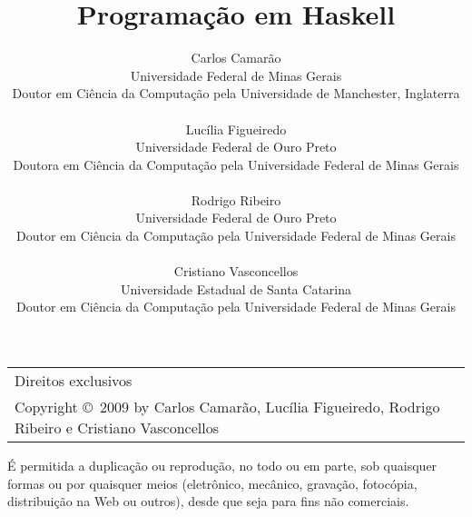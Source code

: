 \documentclass[a4paper,10pt]{book}
\title{Programa\c{c}\~ao em Haskell}
\author{Carlos Camarão\\
{\small Universidade Federal de Minas Gerais}\\
{\small Doutor em Ci\^encia da Computa\c{c}\~ao pela Universidade de Manchester, Inglaterra}\\ \\
Lucília Figueiredo\\
{\small Universidade Federal de Ouro Preto}\\
{\small Doutora em Ci\^encia da Computa\c{c}\~ao pela Universidade Federal de Minas Gerais}\\ \\
Rodrigo Ribeiro\\
{\small Universidade Federal de Ouro Preto}\\
{\small Doutor em Ci\^encia da Computa\c{c}\~ao pela Universidade Federal de Minas Gerais}\\ \\
Cristiano Vasconcellos\\
{\small Universidade Estadual de Santa Catarina}\\
{\small Doutor em Ci\^encia da Computa\c{c}\~ao pela Universidade Federal de Minas Gerais}}
\begin{document}
\maketitle

\begin{tabular}{l}
Direitos exclusivos\\
Copyright \copyright\ 2009 by Carlos Camar\~ao, Lucília Figueiredo, Rodrigo Ribeiro e Cristiano Vasconcellos
\end{tabular}

\'E permitida a duplica\c{c}\~ao ou reprodu\c{c}\~ao, no todo ou em
parte, sob quaisquer formas ou por quaisquer meios (eletr\^onico,
mec\^anico, grava\c{c}\~ao, fotoc\'opia, distribui\c{c}\~ao na Web ou
outros), desde que seja para fins n\~ao comerciais.

\pagestyle{fancy}

\renewcommand{\chaptername}{Capítulo}
\renewcommand{\tablename}{Tabela}
\renewcommand{\figurename}{Figura}
\renewcommand{\contentsname}{Conteúdo}
\renewcommand{\indexname}{Índice}

\tableofcontents

\setcounter{secnumdepth}{-2}


\pagestyle{fancy}
\setcounter{secnumdepth}{10}





%

%
  


	

\pagestyle{fancyplain}




\printindex
\end{document}
